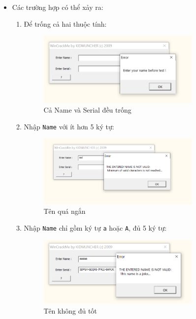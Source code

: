 \begin{itemize}
    \item Các trường hợp có thể xảy ra:
    \begin{enumerate}[label=\textbf{TH\arabic*:}]
        \item Để trống cả hai thuộc tính:
        \begin{figure}[H]
            \centering
            \includegraphics[width=0.8\textwidth]{img/file-2/demo3.PNG}
            \caption{Cả Name và Serial đều trống}
        \end{figure}
        
        \item Nhập \texttt{Name} với ít hơn 5 ký tự:
        \begin{figure}[H]
            \centering
            \includegraphics[width=0.8\textwidth]{img/file-2/demo4.PNG}
            \caption{Tên quá ngắn}
        \end{figure}
        
        \item Nhập \texttt{Name} chỉ gồm ký tự \texttt{a} hoặc \texttt{A}, đủ 5 ký tự:
        \begin{figure}[H]
            \centering
            \includegraphics[width=0.8\textwidth]{img/file-2/demo5.PNG}
            \caption{Tên không đủ tốt}
        \end{figure}
        

\end{enumerate}
\end{itemize}

